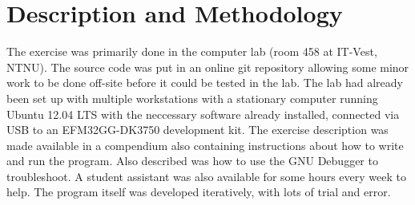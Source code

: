 \chapter{Description and Methodology}
The exercise was primarily done in the computer lab (room 458 at IT-Vest, NTNU). The source code was put in an online git repository allowing some minor work to be done off-site before it could be tested in the lab.
The lab had already been set up with multiple workstations with a stationary computer running Ubuntu 12.04 LTS with the neccessary software already installed, connected via USB to an EFM32GG-DK3750 development kit.
The exercise description was made available in a compendium also containing instructions about how to write and run the program. Also described was how to use the GNU Debugger to troubleshoot. A student assistant was also available for some hours every week to help.
The program itself was developed iteratively, with lots of trial and error.
